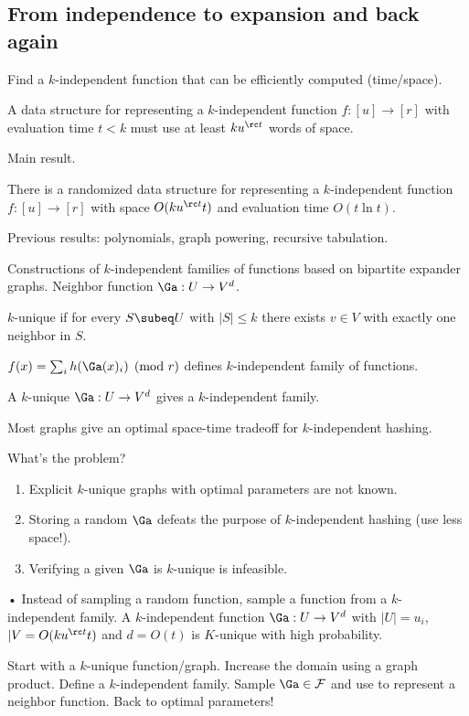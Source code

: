 \subsection{From independence to expansion and back again}

Find a $k$-independent function that can be efficiently computed (time/space).

A data structure for representing a $k$-independent function $f:[u]\to [r]$ with evaluation time $t<k$ must use at least $ku^{\rc t}$ words of space.

Main result.
\begin{thm}
There is a randomized data structure for representing a $k$-independent function $f:[u]\to [r]$ with space $O(ku^{\rc t}t)$ and evaluation time $O(t\ln t)$. 
\end{thm}
Previous results: polynomials, graph powering, recursive tabulation.

Constructions of $k$-independent families of functions based on bipartite expander graphs. Neighbor function $\Ga:U\to V^d$.
\begin{df}
$k$-unique if for every $S\subeq U$ with $|S|\le k$ there exists $v\in V$ with exactly one neighbor in $S$.
\end{df}
\begin{lem}[Siegel]
$f(x)=\sum_i h(\Ga(x)_i)\pmod r$ defines $k$-independent family of functions.
\end{lem}

A $k$-unique $\Ga:U\to V^d$ gives a $k$-independent family. 

Most graphs give an optimal space-time tradeoff for $k$-independent hashing.

What's the problem?
\begin{enumerate}
\item
Explicit $k$-unique graphs with optimal parameters are not known.
\item
Storing a random $\Ga$ defeats the purpose of $k$-independent hashing (use less space!). 
\item
Verifying a given $\Ga$ is $k$-unique is infeasible.
\end{enumerate}•
Instead of sampling a random function, sample a function from a $k$-independent family. 
A $k$-independent function $\Ga:U\to V^d$ with $|U|=u_i$, $|V=O(ku^{\rc t}t)$ and $d=O(t)$ is $K$-unique with high probability.

Start with a $k$-unique function/graph. Increase the domain using a graph product. Define a $k$-independent family. Sample $\Ga\in \cal F$ and use to represent a neighbor function. Back to optimal parameters!

